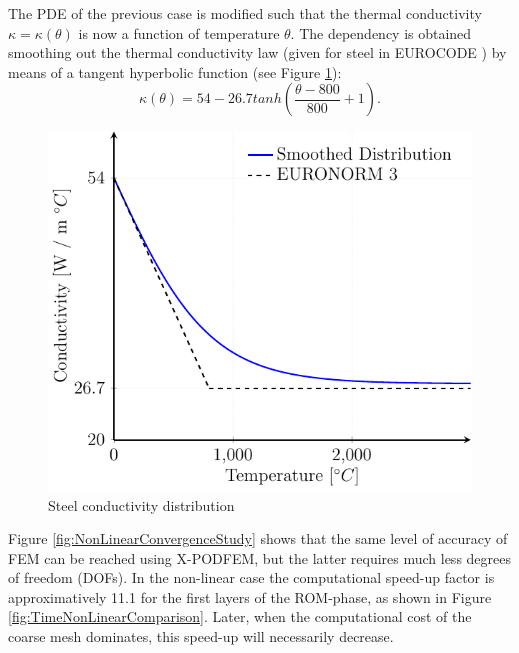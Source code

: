 \documentclass[3p]{article}
\begin{document}
The PDE of the previous case is modified such that the thermal conductivity $\kappa = \kappa(\theta)$ is now a function of temperature $\theta$. The dependency is obtained smoothing out the thermal conductivity law (given for steel in EUROCODE \cite{EN1993}) by means of a tangent hyperbolic function (see Figure \ref{fig:Conductivity}):
\begin{equation}
	\kappa(\theta) = 54 - 26.7tanh\left(\dfrac{\theta-800}{800}+1\right).
\end{equation}
\begin{figure}[!h]
\centering
  \includegraphics[width=0.5\linewidth]{Pictures/ConductivityDistribution.pdf}
  \caption{Steel conductivity distribution}
  \label{fig:Conductivity}
  
\end{figure}
Figure \ref{fig:NonLinearConvergenceStudy} shows that the same level of accuracy of FEM can be reached using X-PODFEM, but the latter requires much less degrees of freedom (DOFs). In the non-linear case the computational speed-up factor is approximatively 11.1 for the first layers of the ROM-phase, as shown in Figure \ref{fig:TimeNonLinearComparison}. Later, when the computational cost of the coarse mesh dominates, this speed-up will necessarily decrease.

\end{document}
